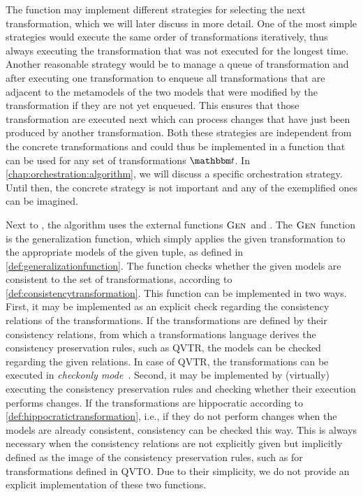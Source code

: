 The  function may implement different strategies for selecting the next transformation, which we will later discuss in more detail.
One of the most simple strategies would execute the same order of transformations iteratively, thus always executing the transformation that was not executed for the longest time.
Another reasonable strategy would be to manage a queue of transformation and after executing one transformation to enqueue all transformations that are adjacent to the metamodels of the two models that were modified by the transformation if they are not yet enqueued.
This ensures that those transformation are executed next which can process changes that have just been produced by another transformation.
Both these strategies are independent from the concrete transformations and could thus be implemented in a function that can be used for any set of transformations $\transformationset{T}$.
In \autoref{chap:orchestration:algorithm}, we will discuss a specific orchestration strategy.
Until then, the concrete strategy is not important and any of the exemplified ones can be imagined.

Next to , the algorithm uses the external functions $\textsc{Gen}_{}$ and .
The $\textsc{Gen}_{}$ function is the generalization function, which simply applies the given transformation to the appropriate models of the given tuple, as defined in \autoref{def:generalizationfunction}.
The  function checks whether the given models are consistent to the set of transformations, according to \autoref{def:consistencytransformation}.
This function can be implemented in two ways.
First, it may be implemented as an explicit check regarding the consistency relations of the transformations.
If the transformations are defined by their consistency relations, from which a transformations language derives the consistency preservation rules, such as \gls{QVTR}, the models can be checked regarding the given relations.
In case of \gls{QVTR}, the transformations can be executed in \emph{checkonly mode}~\cite[Sec. 7.9]{qvt}.
Second, it may be implemented by (virtually) executing the consistency preservation rules and checking whether their execution performs changes.
If the transformations are hippocratic according to \autoref{def:hippocratictransformation}, i.e., if they do not perform changes when the models are already consistent, consistency can be checked this way.
This is always necessary when the consistency relations are not explicitly given but implicitly defined as the image of the consistency preservation rules, such as for transformations defined in \gls{QVTO}.
Due to their simplicity, we do not provide an explicit implementation of these two functions.

